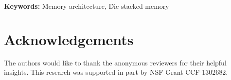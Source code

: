 \documentclass{sig-alternate}
\newif\ifOldResults
\begin{document}
\noindent \textbf{Keywords:} Memory architecture, Die-stacked memory



%


%

\ifOldResults

\else

\fi


\section*{Acknowledgements}
The authors would like to thank the anonymous reviewers
for their helpful insights. This research
was supported in part by NSF Grant CCF-1302682.

%


\end{document}
